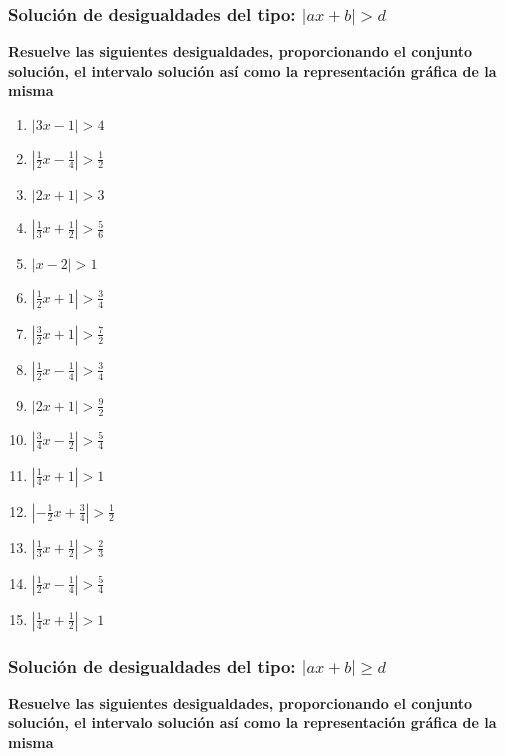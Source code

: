 \documentclass[12pt]{article}
\theoremstyle{plain}
\theoremstyle{definition}
\theoremstyle{remark}
\begin{document}
{\subsubsection{Solución de desigualdades del tipo: \(|ax+b| >d\)}
\textbf{Resuelve las siguientes desigualdades, proporcionando el conjunto solución, el intervalo solución así como la representación gráfica de la misma}

\begin{enumerate}
\def\labelenumi{\arabic{enumi}.}
\item
  \(|3x-1|>4\)
\item
  \(|\frac{1}{2}x-\frac{1}{4}|>\frac{1}{2}\)
\item
  \(|2x+1|>3\)
\item
  \(|\frac{1}{3}x+\frac{1}{2}|>\frac{5}{6}\)
\item
  \(|x-2|>1\)
\item
  \(|\frac{1}{2}x+1|>\frac{3}{4}\)
\item
  \(|\frac{3}{2}x+1|>\frac{7}{2}\)
\item
  \(|\frac{1}{2}x-\frac{1}{4}|>\frac{3}{4}\)
\item
  \(|2x+1|>\frac{9}{2}\)
\item
  \(|\frac{3}{4}x-\frac{1}{2}|>\frac{5}{4}\)
\item
  \(|\frac{1}{4}x+1|>1\)
\item
  \(|-\frac{1}{2}x+\frac{3}{4}|>\frac{1}{2}\)
\item
  \(|\frac{1}{3}x+\frac{1}{2}|>\frac{2}{3}\)
\item
  \(|\frac{1}{2}x-\frac{1}{4}|>\frac{5}{4}\)
\item
  \(|\frac{1}{4}x+\frac{1}{2}|>1\)
\end{enumerate}

\subsubsection{Solución de desigualdades del tipo: \(|ax+b| \geq d\)}

\textbf{Resuelve las siguientes desigualdades, proporcionando el conjunto solución, el intervalo solución así como la representación gráfica de la misma}

}
\end{document}
